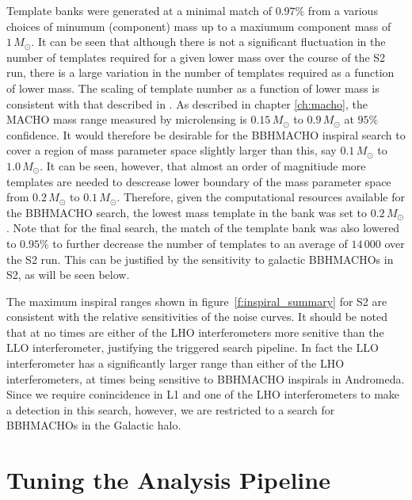 Template banks were generated at a minimal match of $0.97\%$ from a various
choices of minumum (component) mass up to a maxiumum component mass of
$1\,M_\odot$. It can be seen that although there is not a significant
fluctuation in the number of templates required for a given lower mass over
the course of the S2 run, there is a large variation in the number of
templates required as a function of lower mass. The scaling of template number
as a function of lower mass is consistent with that described in
\cite{Owen:1998dk}. As described in chapter \ref{ch:macho}, the MACHO mass
range measured by microlensing is $0.15\,M_\odot$ to $0.9\,M_\odot$ at $95\%$
confidence. It would therefore be desirable for the BBHMACHO inspiral search
to cover a region of mass parameter space slightly larger than this, say
$0.1\,M_\odot$ to $1.0\,M_\odot$.  It can be seen, however, that almost an
order of magnitiude more templates are needed to descrease lower boundary of
the mass parameter space from $0.2\,M_\odot$ to $0.1\,M_\odot$.  Therefore,
given the computational resources available for the BBHMACHO search, the
lowest mass template in the bank was set to $0.2\,M_\odot$. Note that for the
final search, the match of the template bank was also lowered to $0.95\%$ to
further decrease the number of templates to an average of $14\,000$ over the
S2 run. This can be justified by the sensitivity to galactic BBHMACHOs in S2,
as will be seen below.

The maximum inspiral ranges shown in figure~\ref{f:inspiral_summary} for S2
are consistent with the relative sensitivities of the noise curves. It should
be noted that at no times are either of the LHO interferometers more senitive
than the LLO interferometer, justifying the triggered search pipeline. In fact
the LLO interferometer has a significantly larger range than either of the LHO
interferometers, at times being sensitive to BBHMACHO inspirals in Andromeda.
Since we require conincidence in L1 and one of the LHO interferometers to make
a detection in this search, however, we are restricted to a search for
BBHMACHOs in the Galactic halo.  

\section{Tuning the Analysis Pipeline}
\label{s:s2tuning}

